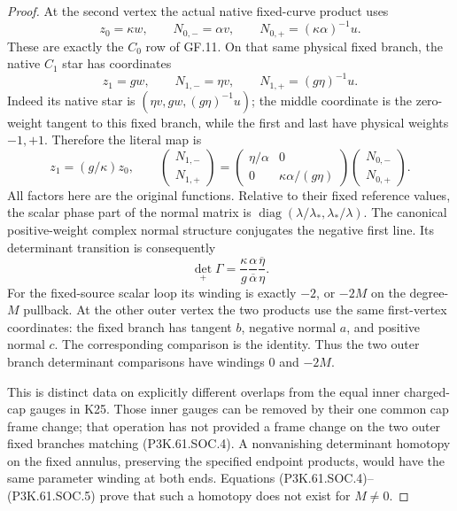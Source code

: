 \begin{proof}
At the second vertex the actual native fixed-curve product uses
\[
 z_0=\kappa w,\qquad N_{0,-}=\alpha v,\qquad
 N_{0,+}=(\kappa\alpha)^{-1}u.
 \tag{P3K.61.SOC.2}
\]
These are exactly the \(C_0\) row of GF.11. On that same physical
fixed branch, the native \(C_1\) star has coordinates
\[
 z_1=g w,\qquad N_{1,-}=\eta v,\qquad
 N_{1,+}=(g\eta)^{-1}u.
 \tag{P3K.61.SOC.3}
\]
Indeed its native star is
\((\eta v,g w,(g\eta)^{-1}u)\); the middle coordinate is the
zero-weight tangent to this fixed branch, while the first and last
have physical weights \(-1,+1\). Therefore the literal map is
\[
 z_1=(g/\kappa)z_0,\qquad
 \begin{pmatrix}N_{1,-}\\N_{1,+}\end{pmatrix}
 =\begin{pmatrix}
 \eta/\alpha&0\\0&\kappa\alpha/(g\eta)
 \end{pmatrix}
 \begin{pmatrix}N_{0,-}\\N_{0,+}\end{pmatrix}.
 \tag{P3K.61.SOC.4}
\]
All factors here are the original functions. Relative to their fixed
reference values, the scalar phase part of the normal matrix is
\(\operatorname{diag}(\lambda/\lambda_*,\lambda_*/\lambda)\).
The canonical positive-weight complex normal structure conjugates
the negative first line. Its determinant transition is consequently
\[
 \det_+\Gamma
 =\frac{\kappa}{g}\frac{\alpha}{\overline\alpha}
                     \frac{\overline\eta}{\eta}.
 \tag{P3K.61.SOC.5}
\]
For the fixed-source scalar loop its winding is exactly \(-2\), or
\(-2M\) on the degree-\(M\) pullback. At the other outer vertex the
two products use the same first-vertex coordinates: the fixed branch
has tangent \(b\), negative normal \(a\), and positive normal \(c\).
The corresponding comparison is the identity. Thus the two outer
branch determinant comparisons have windings \(0\) and \(-2M\).

This is distinct data on explicitly different overlaps from the equal
inner charged-cap gauges in K25. Those inner gauges can be removed by
their one common cap frame change; that operation has not provided a
frame change on the two outer fixed branches matching (P3K.61.SOC.4). A
nonvanishing determinant homotopy on the fixed annulus, preserving the
specified endpoint products, would have the same parameter winding at
both ends. Equations (P3K.61.SOC.4)--\allowbreak (P3K.61.SOC.5) prove that such a homotopy does
not exist for \(M\ne0\).


\end{proof}
